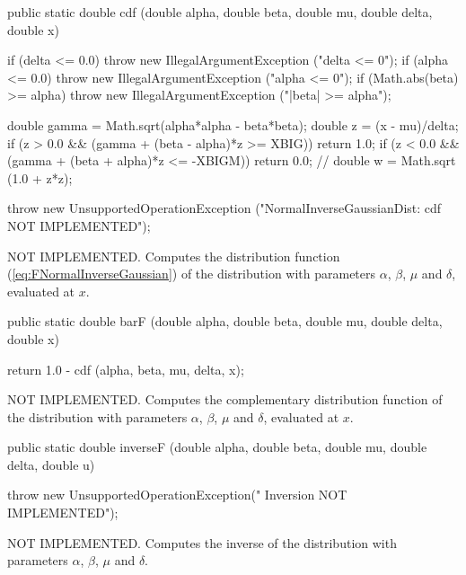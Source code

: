 \begin{code}

   public static double cdf (double alpha, double beta, double mu,
                             double delta, double x)\begin{hide} {
      if (delta <= 0.0)
         throw new IllegalArgumentException ("delta <= 0");
      if (alpha <= 0.0)
         throw new IllegalArgumentException ("alpha <= 0");
      if (Math.abs(beta) >= alpha)
         throw new IllegalArgumentException ("|beta| >= alpha");

      double gamma = Math.sqrt(alpha*alpha - beta*beta);
      double z = (x - mu)/delta;
      if (z > 0.0 && (gamma + (beta - alpha)*z >= XBIG))
         return 1.0;
      if (z < 0.0 && (gamma + (beta + alpha)*z <= -XBIGM))
         return 0.0;
 //     double w = Math.sqrt (1.0 + z*z);

      throw new UnsupportedOperationException
         ("NormalInverseGaussianDist:   cdf NOT IMPLEMENTED");
   }\end{hide}
\end{code}
\begin{tabb}
    NOT IMPLEMENTED.
   Computes the distribution function (\ref{eq:FNormalInverseGaussian})
   of the \nig{} distribution with parameters $\alpha$,
  $\beta$, $\mu$ and $\delta$, evaluated at $x$.
 \end{tabb}
\begin{code}

   public static double barF (double alpha, double beta, double mu,
                              double delta, double x)\begin{hide} {
      return 1.0 - cdf (alpha, beta, mu, delta, x);
   }\end{hide}
\end{code}
\begin{tabb}
    NOT IMPLEMENTED.
 Computes the complementary distribution function of the \nig{} distribution
 with parameters $\alpha$, $\beta$, $\mu$ and $\delta$, evaluated at $x$.
 \end{tabb}
\begin{code}

   public static double inverseF (double alpha, double beta, double mu,
                                  double delta, double u)\begin{hide} {
      throw new UnsupportedOperationException(" Inversion NOT IMPLEMENTED");
   }\end{hide}
\end{code}
\begin{tabb}
    NOT IMPLEMENTED. Computes the inverse of the \nig{} distribution
   with parameters $\alpha$, $\beta$, $\mu$ and $\delta$.
 \end{tabb}
